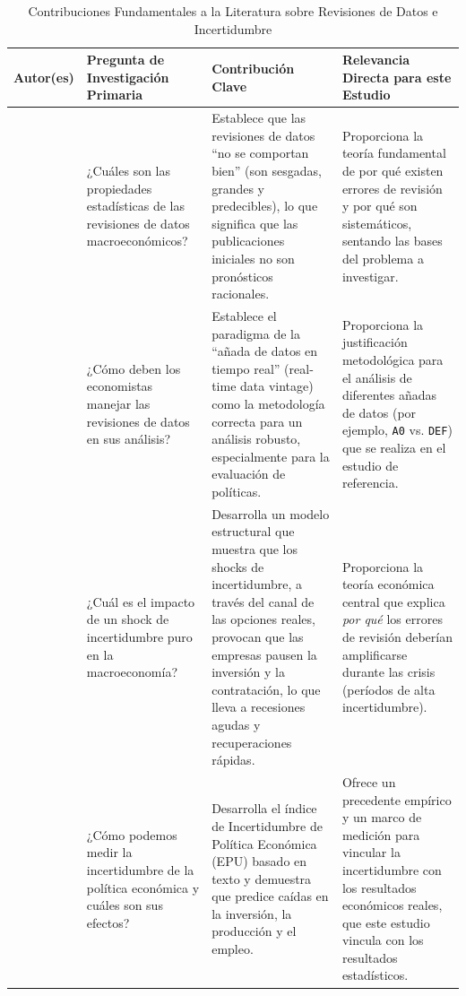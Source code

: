 \documentclass{article}
\begin{document}
\begin{table}[h!]
\centering
\caption{Contribuciones Fundamentales a la Literatura sobre Revisiones de Datos e Incertidumbre}
\label{tab:contribuciones}
    \begin{tabularx}{\textwidth}{|l|X|X|X|}
        \hline
        \textbf{Autor(es)} & \textbf{Pregunta de Investigación Primaria} & \textbf{Contribución Clave} & \textbf{Relevancia Directa para este Estudio} \\
        \hline
        \citet{aruoba2008} & ¿Cuáles son las propiedades estadísticas de las revisiones de datos macroeconómicos? & Establece que las revisiones de datos ``no se comportan bien'' (son sesgadas, grandes y predecibles), lo que significa que las publicaciones iniciales no son pronósticos racionales. & Proporciona la teoría fundamental de por qué existen errores de revisión y por qué son sistemáticos, sentando las bases del problema a investigar. \\
        \hline
        \citet{croushore2011} & ¿Cómo deben los economistas manejar las revisiones de datos en sus análisis? & Establece el paradigma de la ``añada de datos en tiempo real'' (real-time data vintage) como la metodología correcta para un análisis robusto, especialmente para la evaluación de políticas. & Proporciona la justificación metodológica para el análisis de diferentes añadas de datos (por ejemplo, \texttt{A0} vs. \texttt{DEF}) que se realiza en el estudio de referencia. \\
        \hline
        \citet{bloom2009} & ¿Cuál es el impacto de un shock de incertidumbre puro en la macroeconomía? & Desarrolla un modelo estructural que muestra que los shocks de incertidumbre, a través del canal de las opciones reales, provocan que las empresas pausen la inversión y la contratación, lo que lleva a recesiones agudas y recuperaciones rápidas. & Proporciona la teoría económica central que explica \textit{por qué} los errores de revisión deberían amplificarse durante las crisis (períodos de alta incertidumbre). \\
        \hline
        \citet{baker2016} & ¿Cómo podemos medir la incertidumbre de la política económica y cuáles son sus efectos? & Desarrolla el índice de Incertidumbre de Política Económica (EPU) basado en texto y demuestra que predice caídas en la inversión, la producción y el empleo. & Ofrece un precedente empírico y un marco de medición para vincular la incertidumbre con los resultados económicos reales, que este estudio vincula con los resultados estadísticos. \\
        \hline
    \end{tabularx}
\end{table}
\end{document}
